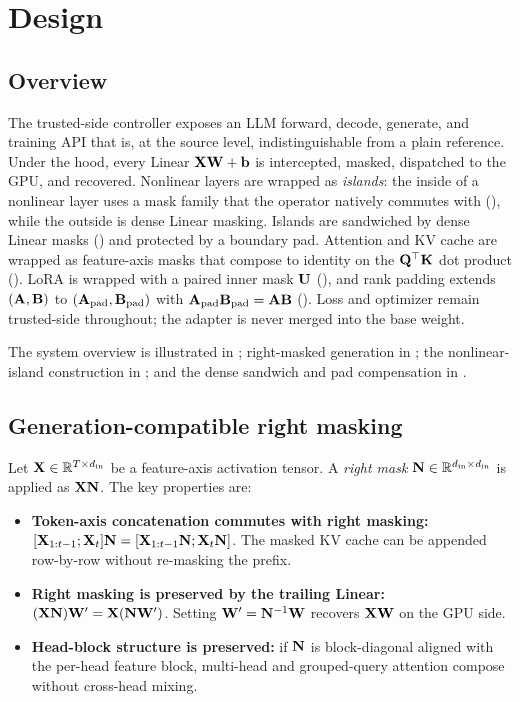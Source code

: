 \section{Design}
\label{sec:design}

\subsection{Overview}
The trusted-side controller exposes an LLM forward, decode, generate, and training API that is, at the source level, indistinguishable from a plain reference. Under the hood, every Linear $\mathbf{X}\mathbf{W} + \mathbf{b}$ is intercepted, masked, dispatched to the GPU, and recovered. Nonlinear layers are wrapped as \emph{islands}: the inside of a nonlinear layer uses a mask family that the operator natively commutes with (), while the outside is dense Linear masking. Islands are sandwiched by dense Linear masks () and protected by a boundary pad. Attention and KV cache are wrapped as feature-axis masks that compose to identity on the $\mathbf{Q}^{\top}\mathbf{K}$ dot product (). LoRA is wrapped with a paired inner mask $\mathbf{U}$ (), and rank padding extends $(\mathbf{A}, \mathbf{B})$ to $(\mathbf{A}_{\mathrm{pad}}, \mathbf{B}_{\mathrm{pad}})$ with $\mathbf{A}_{\mathrm{pad}}\mathbf{B}_{\mathrm{pad}} = \mathbf{A}\mathbf{B}$ (). Loss and optimizer remain trusted-side throughout; the adapter is never merged into the base weight.

The system overview is illustrated in ; right-masked generation in ; the nonlinear-island construction in ; and the dense sandwich and pad compensation in .



\subsection{Generation-compatible right masking}
\label{sec:design:right-mask}
Let $\mathbf{X} \in \mathbb{R}^{T \times d_{\mathrm{in}}}$ be a feature-axis activation tensor. A \emph{right mask} $\mathbf{N} \in \mathbb{R}^{d_{\mathrm{in}} \times d_{\mathrm{in}}}$ is applied as $\mathbf{X}\mathbf{N}$. The key properties are:

\begin{itemize}[leftmargin=*, nosep]
  \item \textbf{Token-axis concatenation commutes with right masking:} $[\mathbf{X}_{1:t-1}; \mathbf{X}_t]\mathbf{N} = [\mathbf{X}_{1:t-1}\mathbf{N}; \mathbf{X}_t\mathbf{N}]$. The masked KV cache can be appended row-by-row without re-masking the prefix.
  \item \textbf{Right masking is preserved by the trailing Linear:} $(\mathbf{X}\mathbf{N})\mathbf{W}' = \mathbf{X}(\mathbf{N}\mathbf{W}')$. Setting $\mathbf{W}' = \mathbf{N}^{-1}\mathbf{W}$ recovers $\mathbf{X}\mathbf{W}$ on the GPU side.
  \item \textbf{Head-block structure is preserved:} if $\mathbf{N}$ is block-diagonal aligned with the per-head feature block, multi-head and grouped-query attention compose without cross-head mixing.
\end{itemize}

